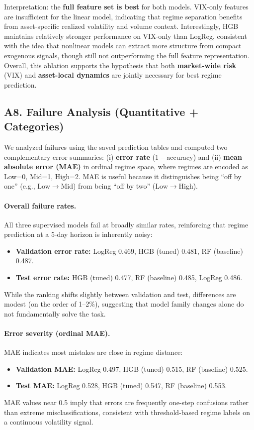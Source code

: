 \documentclass[11pt]{article}
\begin{document}
Interpretation: the \textbf{full feature set is best} for both models. VIX-only features are insufficient for the linear model, indicating that regime separation benefits from asset-specific realized volatility and volume context. Interestingly, HGB maintains relatively stronger performance on VIX-only than LogReg, consistent with the idea that nonlinear models can extract more structure from compact exogenous signals, though still not outperforming the full feature representation. Overall, this ablation supports the hypothesis that both \textbf{market-wide risk} (VIX) and \textbf{asset-local dynamics} are jointly necessary for best regime prediction.

\subsection{A8. Failure Analysis (Quantitative + Categories)}
We analyzed failures using the saved prediction tables and computed two complementary error summaries: (i) \textbf{error rate} (1 -- accuracy) and (ii) \textbf{mean absolute error (MAE)} in ordinal regime space, where regimes are encoded as Low=0, Mid=1, High=2. MAE is useful because it distinguishes being ``off by one'' (e.g., Low$\rightarrow$Mid) from being ``off by two'' (Low$\rightarrow$High).

\paragraph{Overall failure rates.}
All three supervised models fail at broadly similar rates, reinforcing that regime prediction at a 5-day horizon is inherently noisy:
\begin{itemize}
    \item \textbf{Validation error rate:} LogReg 0.469, HGB (tuned) 0.481, RF (baseline) 0.487.
    \item \textbf{Test error rate:} HGB (tuned) 0.477, RF (baseline) 0.485, LogReg 0.486.
\end{itemize}
While the ranking shifts slightly between validation and test, differences are modest (on the order of 1--2\%), suggesting that model family changes alone do not fundamentally solve the task.

\paragraph{Error severity (ordinal MAE).}
MAE indicates most mistakes are close in regime distance:
\begin{itemize}
    \item \textbf{Validation MAE:} LogReg 0.497, HGB (tuned) 0.515, RF (baseline) 0.525.
    \item \textbf{Test MAE:} LogReg 0.528, HGB (tuned) 0.547, RF (baseline) 0.553.
\end{itemize}
MAE values near 0.5 imply that errors are frequently one-step confusions rather than extreme misclassifications, consistent with threshold-based regime labels on a continuous volatility signal.
\end{document}
